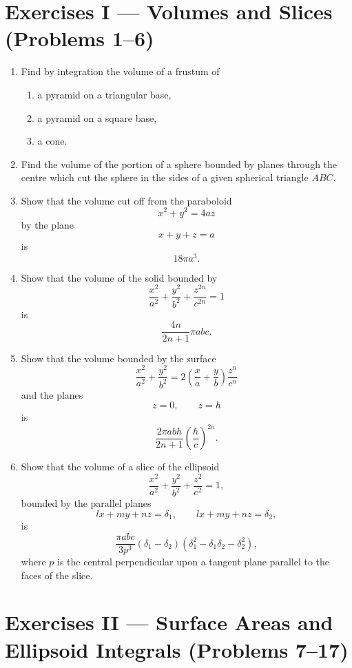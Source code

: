 \documentclass[11pt, a4paper]{article}
\begin{document}
\section*{Exercises I --- Volumes and Slices (Problems 1--6)}

\begin{enumerate}[leftmargin=2em]

\item Find by integration the volume of a frustum of
\begin{enumerate}[label=(\arabic*)]
\item a pyramid on a triangular base,
\item a pyramid on a square base,
\item a cone.
\end{enumerate}

\item Find the volume of the portion of a sphere bounded by planes through the centre which cut the sphere in the sides of a given spherical triangle $ABC$.

\item Show that the volume cut off from the paraboloid
\[
x^2+y^2=4az
\]
by the plane
\[
x+y+z=a
\]
is
\[
18\pi a^3.
\]

\item Show that the volume of the solid bounded by
\[
\frac{x^2}{a^2}+\frac{y^2}{b^2}+\frac{z^{2n}}{c^{2n}}=1
\]
is
\[
\frac{4n}{2n+1}\pi abc.
\]

\item Show that the volume bounded by the surface
\[
\frac{x^2}{a^2}+\frac{y^2}{b^2}
=
2\left(\frac{x}{a}+\frac{y}{b}\right)\frac{z^n}{c^n}
\]
and the planes
\[
z=0,\qquad z=h
\]
is
\[
\frac{2\pi abh}{2n+1}\left(\frac{h}{c}\right)^{2n}.
\]

\item Show that the volume of a slice of the ellipsoid
\[
\frac{x^2}{a^2}+\frac{y^2}{b^2}+\frac{z^2}{c^2}=1,
\]
bounded by the parallel planes
\[
lx+my+nz=\delta_1,\qquad
lx+my+nz=\delta_2,
\]
is
\[
\frac{\pi abc}{3p^3}
(\delta_1-\delta_2)
(\delta_1^2-\delta_1\delta_2-\delta_2^2),
\]
where $p$ is the central perpendicular upon a tangent plane parallel to the faces of the slice.

\end{enumerate}

\section*{Exercises II --- Surface Areas and Ellipsoid Integrals (Problems 7--17)}
\end{document}
